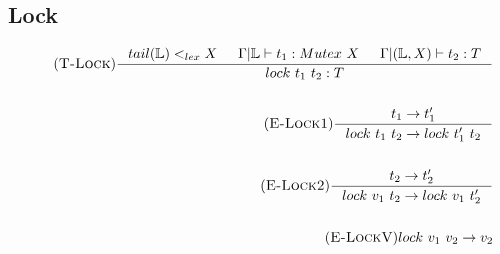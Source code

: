 \documentclass[12pt]{article}
\def\lock {\mathbb{L}}
\begin{document}
\subsection{Lock}
\begin{align*}
\tag{\textsc{T-Lock}}
\inference[]{tail(\lock)<_{lex}X & \Gamma|\lock \vdash t_1:Mutex~X 
& \Gamma|(\lock,X) \vdash t_2:T}{lock~t_1~t_2:T}
\\
\\
\tag{\textsc{E-Lock1}}
\inference[]{t_1->t_1'}{lock~t_1~t_2 -> lock~t_1'~t_2}
\\
\\
\tag{\textsc{E-Lock2}}
\inference[]{t_2->t_2'}{lock~v_1~t_2 -> lock~v_1~t_2'}
\\
\\
\tag{\textsc{E-LockV}}lock~v_1~v_2 -> v_2
\end{align*}
\end{document}
